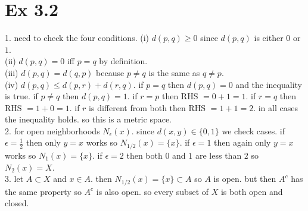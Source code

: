 \documentclass{report}
\begin{document}
\section*{Ex 3.2}


\begin{proofWithHibiscus}
  1. need to check the four conditions.  
     (i) $d(p,q) \geq 0$ since $d(p,q)$ is either $0$ or $1$.  \\
     (ii) $d(p,q) = 0$ iff $p=q$ by definition.  \\
     (iii) $d(p,q) = d(q,p)$ because $p\neq q$ is the same as $q\neq p$.  \\
     (iv) $d(p,q) \leq d(p,r) + d(r,q)$. if $p=q$ then $d(p,q)=0$ and the inequality is true. if $p\neq q$ then $d(p,q)=1$. if $r=p$ then RHS $=0+1=1$. if $r=q$ then RHS $=1+0=1$. if $r$ is different from both then RHS $=1+1=2$. in all cases the inequality holds. so this is a metric space.  \\
  
  2. for open neighborhoods $N_\epsilon(x)$. since $d(x,y)\in\{0,1\}$ we check cases. if $\epsilon=\tfrac12$ then only $y=x$ works so $N_{1/2}(x)=\{x\}$. if $\epsilon=1$ then again only $y=x$ works so $N_{1}(x)=\{x\}$. if $\epsilon=2$ then both $0$ and $1$ are less than $2$ so $N_{2}(x)=X$.  \\
  
  3. let $A\subset X$ and $x\in A$. then $N_{1/2}(x)=\{x\}\subset A$ so $A$ is open. but then $A^c$ has the same property so $A^c$ is also open. so every subset of $X$ is both open and closed.  
  \end{proofWithHibiscus}
  
  
\end{document}
